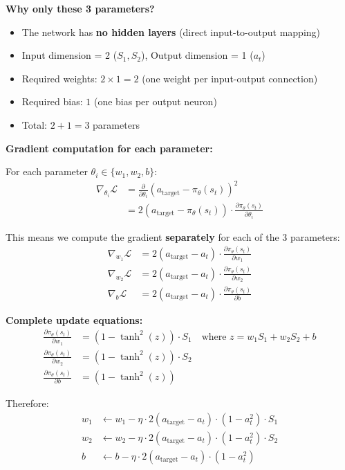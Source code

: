 \documentclass[11pt,a4paper]{article}
\begin{document}
\begin{itemize}
\textbf{Why only these 3 parameters?}
\begin{itemize}
    \item The network has \textbf{no hidden layers} (direct input-to-output mapping)
    \item Input dimension = 2 ($S_1, S_2$), Output dimension = 1 ($a_t$)
    \item Required weights: $2 \times 1 = 2$ (one weight per input-output connection)
    \item Required bias: $1$ (one bias per output neuron)
    \item Total: $2 + 1 = 3$ parameters
\end{itemize}

\textbf{Gradient computation for each parameter:}

For each parameter $\theta_i \in \{w_1, w_2, b\}$:
\begin{align}
\nabla_{\theta_i} \mathcal{L} &= \frac{\partial}{\partial \theta_i} (a_{\text{target}} - \pi_\theta(s_t))^2 \\
&= 2(a_{\text{target}} - \pi_\theta(s_t)) \cdot \frac{\partial \pi_\theta(s_t)}{\partial \theta_i}
\end{align}

This means we compute the gradient \textbf{separately} for each of the 3 parameters:
\begin{align}
\nabla_{w_1} \mathcal{L} &= 2(a_{\text{target}} - a_t) \cdot \frac{\partial \pi_\theta(s_t)}{\partial w_1} \\
\nabla_{w_2} \mathcal{L} &= 2(a_{\text{target}} - a_t) \cdot \frac{\partial \pi_\theta(s_t)}{\partial w_2} \\
\nabla_{b} \mathcal{L} &= 2(a_{\text{target}} - a_t) \cdot \frac{\partial \pi_\theta(s_t)}{\partial b}
\end{align}

\textbf{Complete update equations:}
\begin{align}
\frac{\partial \pi_\theta(s_t)}{\partial w_1} &= (1 - \tanh^2(z)) \cdot S_1 \quad \text{where } z = w_1 S_1 + w_2 S_2 + b \\
\frac{\partial \pi_\theta(s_t)}{\partial w_2} &= (1 - \tanh^2(z)) \cdot S_2 \\
\frac{\partial \pi_\theta(s_t)}{\partial b} &= (1 - \tanh^2(z))
\end{align}

Therefore:
\begin{align}
w_1 &\leftarrow w_1 - \eta \cdot 2(a_{\text{target}} - a_t) \cdot (1 - a_t^2) \cdot S_1 \\
w_2 &\leftarrow w_2 - \eta \cdot 2(a_{\text{target}} - a_t) \cdot (1 - a_t^2) \cdot S_2 \\
b &\leftarrow b - \eta \cdot 2(a_{\text{target}} - a_t) \cdot (1 - a_t^2)
\end{align}


\end{itemize}
\end{document}
